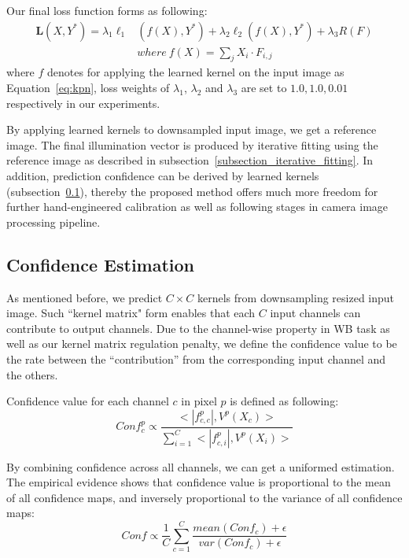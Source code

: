 \documentclass[10pt,twocolumn,letterpaper]{article}
\begin{document}
Our final loss function forms as following:
\begin{equation}
\left.\begin{aligned}
\textbf{L}(X,Y^*) = \lambda_1 \ell_1 & (f(X),Y^*) + \lambda_2 \ell_2(f(X),Y^*) + \lambda_3 R(F) \\
& where \ f(X) = \sum_{j}X_i \cdot F_{i,j}
\end{aligned}\right.
\label{whole_loss}
\end{equation}
where $f$ denotes for applying the learned kernel on the input image as Equation~\ref{eq:kpn},
loss weights of $\lambda_1$, $\lambda_2$ and $\lambda_3$ are set to $1.0, 1.0, 0.01$ respectively in our experiments.

By applying learned kernels to downsampled input image, we get a reference image.
The final illumination vector is produced by iterative fitting using the reference image as described in subsection~\ref{subsection_iterative_fitting}.
In addition, prediction confidence can be derived by learned kernels (subsection~\ref{subsection_confidence_map}),
thereby the proposed method offers much more freedom for further hand-engineered calibration
as well as following stages in camera image processing pipeline.

\subsection{Confidence Estimation}
\label{subsection_confidence_map}
As mentioned before,
we predict $C\times{C}$ kernels from downsampling resized input image.
Such ``kernel matrix" form enables that each $C$ input channels can contribute to output channels.
Due to the channel-wise property in WB task as well as our kernel matrix regulation penalty,
we define the confidence value to be the rate between the ``contribution'' from the corresponding input channel and the others.

Confidence value for each channel $c$ in pixel $p$ is defined as following:
\begin{equation}
Conf_c^p \propto \frac{<|f^p_{c,c}|, V^p(X_c)>}{\sum_{i=1}^{C}<|f^p_{c,i}|, V^p(X_i)>}
\label{eq:conf_def}
\end{equation}

By combining confidence across all channels, we can get a uniformed estimation.
The empirical evidence shows that confidence value is proportional to the mean of all confidence maps,
and inversely proportional to the variance of all confidence maps:\begin{equation}
Conf \propto \frac{1}{C}\sum_{c=1}^{C} \frac{mean(Conf_c) + \epsilon}{var(Conf_c) + \epsilon}
\label{eq:compute_conf}
\end{equation}
\end{document}
